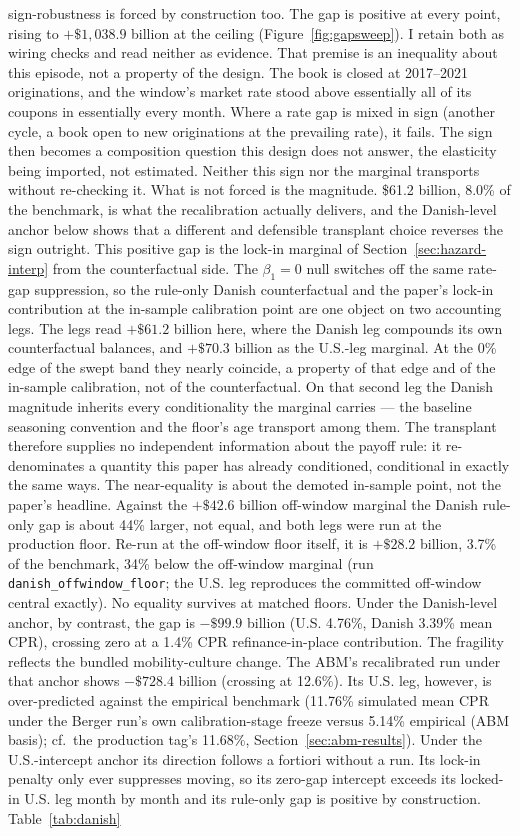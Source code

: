 \documentclass[12pt]{article}
\begin{document}
sign-robustness is forced by construction too. The gap is positive at every point, rising to $+\$1{,}038.9$ billion at the ceiling (Figure~\ref{fig:gapsweep}). I retain both as wiring checks and read neither as evidence. That premise is an inequality about this episode, not a property of the design. The book is closed at 2017--2021 originations, and the window's market rate stood above essentially all of its coupons in essentially every month. Where a rate gap is mixed in sign (another cycle, a book open to new originations at the prevailing rate), it fails. The sign then becomes a composition question this design does not answer, the elasticity being imported, not estimated. Neither this sign nor the marginal transports without re-checking it. What is not forced is the magnitude. \$61.2 billion, 8.0\% of the benchmark, is what the recalibration actually delivers, and the Danish-level anchor below shows that a different and defensible transplant choice reverses the sign outright. This positive gap is the lock-in marginal of Section~\ref{sec:hazard-interp} from the counterfactual side. The $\beta_1 = 0$ null switches off the same rate-gap suppression, so the rule-only Danish counterfactual and the paper's lock-in contribution at the in-sample calibration point are one object on two accounting legs. The legs read $+\$61.2$ billion here, where the Danish leg compounds its own counterfactual balances, and $+\$70.3$ billion as the U.S.-leg marginal. At the 0\% edge of the swept band they nearly coincide, a property of that edge and of the in-sample calibration, not of the counterfactual. On that second leg the Danish magnitude inherits every conditionality the marginal carries --- the baseline seasoning convention and the floor's age transport among them. The transplant therefore supplies no independent information about the payoff rule: it re-denominates a quantity this paper has already conditioned, conditional in exactly the same ways. The near-equality is about the demoted in-sample point, not the paper's headline. Against the $+\$42.6$ billion off-window marginal the Danish rule-only gap is about 44\% larger, not equal, and both legs were run at the production floor. Re-run at the off-window floor itself, it is $+\$28.2$ billion, 3.7\% of the benchmark, 34\% below the off-window marginal (run \texttt{danish\_offwindow\_floor}; the U.S. leg reproduces the committed off-window central exactly). No equality survives at matched floors. Under the Danish-level anchor, by contrast, the gap is $-\$99.9$ billion (U.S. 4.76\%, Danish 3.39\% mean CPR), crossing zero at a 1.4\% CPR refinance-in-place contribution. The fragility reflects the bundled mobility-culture change. The ABM's recalibrated run under that anchor shows $-\$728.4$ billion (crossing at 12.6\%). Its U.S. leg, however, is over-predicted against the empirical benchmark (11.76\% simulated mean CPR under the Berger run's own calibration-stage freeze versus 5.14\% empirical (ABM basis); cf.\ the production tag's 11.68\%, Section~\ref{sec:abm-results}). Under the U.S.-intercept anchor its direction follows a fortiori without a run. Its lock-in penalty only ever suppresses moving, so its zero-gap intercept exceeds its locked-in U.S. leg month by month and its rule-only gap is positive by construction. Table~\ref{tab:danish} 
\end{document}
